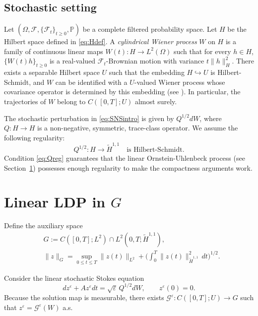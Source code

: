 \documentclass[11pt,a4paper,reqno]{amsart}
\theoremstyle{definition}
\begin{document}
\subsection{Stochastic setting}\label{sec:stochastic}

Let $(\Omega,\mathcal{F},\{\mathcal{F}_t\}_{t\geq0},\mathbb{P})$ be a complete filtered probability
space.
Let $H$ be the Hilbert space defined in \eqref{eq:Hdef}. A \emph{cylindrical Wiener process} $W$ on $H$ is a family of continuous linear maps
$W(t):H\to L^2(\Omega)$ such that for every $h\in H$, $\{W(t)h\}_{t\ge0}$ is a real-valued
$\mathcal{F}_t$-Brownian motion with variance $t\|h\|_H^2$.
There exists a separable Hilbert space $U$ such that the embedding $H\hookrightarrow U$
is Hilbert-Schmidt, and $W$ can be identified with a $U$-valued Wiener process whose
covariance operator is determined by this embedding (see \cite{DPZ,LR}).
In particular, the trajectories of $W$ belong to $C([0,T];U)$ almost surely.

The stochastic perturbation in \eqref{eq:SNSintro} is given by $Q^{1/2}dW$, where
$Q:H\to H$ is a non-negative, symmetric, trace-class operator.
We assume the following regularity:
\begin{equation}\label{eq:Qreg}
  Q^{1/2}: H\longrightarrow \widetilde H^{1,1}\quad\text{is Hilbert-Schmidt}.
\end{equation}
Condition \eqref{eq:Qreg} guarantees that the linear Ornstein-Uhlenbeck process
(see Section~\ref{sec:linear}) possesses enough regularity to make the compactness
arguments work.




\section{Linear LDP in \(G\)}\label{sec:linear}

Define the auxiliary space
\begin{align*}
  &G := C([0,T];L^2)\cap L^2(0,T;\widetilde H^{1,1}),\\
  &\|z\|_{G} = \sup_{0\le t\le T}\|z(t)\|_{L^2} + \biggl(\int_0^T \|z(t)\|_{\widetilde H^{1,1}}^2\,dt\biggr)^{1/2}.
\end{align*}

Consider the linear stochastic Stokes equation
\begin{equation}\label{eq:lin}
  dz^\varepsilon + A z^\varepsilon dt = \sqrt\varepsilon\, Q^{1/2} dW,\qquad z^\varepsilon(0)=0 .
\end{equation}
Because the solution map is measurable, there exists \(\mathcal G^\varepsilon: C([0,T];U)\to G\) such that \(z^\varepsilon = \mathcal G^\varepsilon(W)\) a.s.
\end{document}
